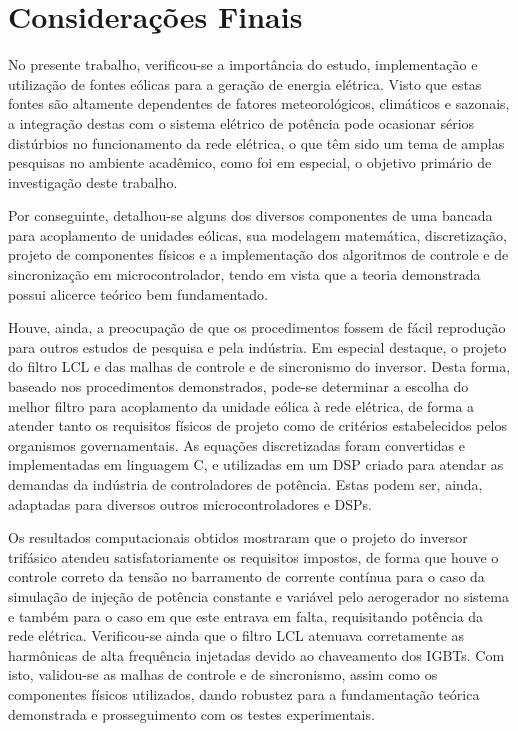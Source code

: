 \chapter{Considerações Finais}

No presente trabalho, verificou-se a importância do estudo, implementação e utilização de fontes eólicas 
para a geração de energia elétrica. Visto que estas fontes são altamente dependentes de fatores meteorológicos, 
climáticos e sazonais, a integração destas com o sistema elétrico de potência pode ocasionar sérios distúrbios 
no funcionamento da rede elétrica, o que têm sido um tema de amplas pesquisas no ambiente acadêmico, 
como foi em especial, o objetivo primário de investigação deste trabalho.

Por conseguinte, detalhou-se alguns dos diversos componentes de uma bancada para acoplamento de unidades eólicas, 
sua modelagem matemática, discretização, projeto de componentes físicos e a implementação dos algoritmos de controle
e de sincronização em microcontrolador, tendo em vista que a teoria demonstrada possui alicerce teórico bem fundamentado.

Houve, ainda, a preocupação de que os procedimentos fossem de fácil reprodução para outros estudos de pesquisa e 
pela indústria. Em especial destaque, o projeto do filtro LCL e das malhas de controle e de sincronismo do inversor.
Desta forma, baseado nos procedimentos demonstrados, pode-se determinar a escolha do melhor filtro para acoplamento da 
unidade eólica à rede elétrica, de forma a atender tanto os requisitos físicos de projeto como de critérios 
estabelecidos pelos organismos governamentais. As equações discretizadas foram convertidas e implementadas em 
linguagem C, e utilizadas em um DSP criado para atendar as demandas da indústria de controladores de potência. Estas podem 
ser, ainda, adaptadas para diversos outros microcontroladores e DSPs.

Os resultados computacionais obtidos mostraram que o projeto do inversor trifásico atendeu satisfatoriamente os requisitos
impostos, de forma que houve o controle correto da tensão no barramento de corrente contínua para o caso da simulação de 
injeção de potência constante e variável pelo aerogerador no sistema e também para o caso em que este entrava em falta, 
requisitando potência da rede elétrica. Verificou-se ainda que o filtro LCL atenuava corretamente as harmônicas de alta 
frequência injetadas devido ao chaveamento dos IGBTs. Com isto, validou-se as malhas de controle e de sincronismo, 
assim como os componentes físicos utilizados, dando robustez para a fundamentação teórica demonstrada e prosseguimento 
com os testes experimentais. 

